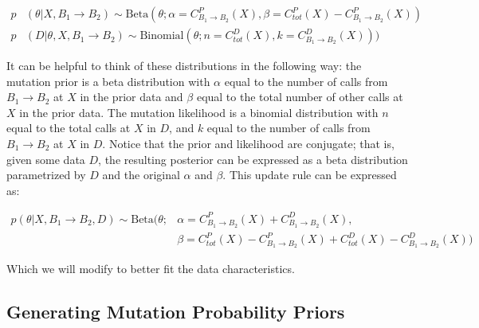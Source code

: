 \documentclass[10pt,letterpaper]{article}
\begin{document}
\begin{equation}
\begin{aligned}
p &(\theta | X, B_1 \rightarrow B_2) \sim \text{Beta}(\theta; \alpha = C^P_{B_1 \rightarrow B_2}(X), \beta = C^P_{tot}(X) - C^P_{B_1 \rightarrow B_2}(X)) \\
p &(D | \theta, X, B_1 \rightarrow B_2) \sim \text{Binomial}(\theta; n = C^D_{tot}(X), k = C^D_{B_1 \rightarrow B_2}(X)))
\end{aligned}
\end{equation}

It can be helpful to think of these distributions in the following way: the mutation prior is a beta distribution with $\alpha$ equal to the number of calls from $B_1 \rightarrow B_2$ at $X$ in the prior data and $\beta$
equal to the total number of other calls at $X$ in the prior data. The mutation likelihood is a binomial distribution with $n$ equal to the total calls at $X$ in $D$, and $k$ equal to the number of calls from
$B_1 \rightarrow B_2$ at $X$ in $D$. Notice that the prior and likelihood are conjugate; that is, given some data $D$, the resulting posterior can be expressed as a beta distribution parametrized by $D$ and the original
$\alpha$ and $\beta$. This update rule can be expressed as:

\begin{equation}
\begin{aligned}
p(\theta | X, B_1 \rightarrow B_2, D) \sim \text{Beta}(\theta; &\alpha = C^P_{B_1 \rightarrow B_2}(X) + C^D_{B_1 \rightarrow B_2}(X), \\ &\beta = C^P_{tot}(X) - C^P_{B_1 \rightarrow B_2}(X) + C^D_{tot}(X) - C^D_{B_1 \rightarrow B_2}(X)) \label{eq:posteriorupdategeneral}
\end{aligned}
\end{equation}

Which we will modify to better fit the data characteristics.

\subsection{Generating Mutation Probability Priors}
\end{document}
